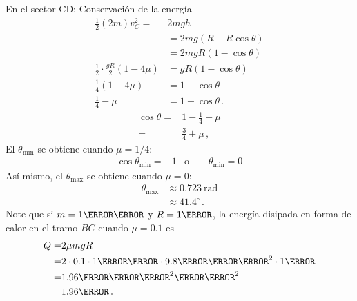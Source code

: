 \begin{itemize}
En el sector CD: Conservación de la energía
\begin{align}
  \tfrac{1}{2}(2m)v_C^2=&2mgh\nonumber\\
&=2mg(R-R\cos\theta)\nonumber\\
&=2mgR(1-\cos\theta)\nonumber\\
  \frac{1}{2}\cdot\frac{gR}{2}\left(1-4\mu \right)&=gR(1-\cos\theta)\nonumber\\
  \frac{1}{4}\left(1-4\mu \right)&=1-\cos\theta\nonumber\\
  \frac{1}{4}-\mu&=1-\cos\theta\,.
\end{align}
\begin{align}
  \cos\theta=&1-\frac{1}{4}+\mu\nonumber\\
  =&\frac{3}{4}+\mu\,,
\end{align}
El $\theta_{\text{min}}$ se obtiene cuando $\mu=1/4$:
\begin{align}
 \cos \theta_{\text{min}}=&1 &\text{o} \qquad \theta_{\text{min}}=0
\end{align}
Así mismo, el $\theta_{\text{max}}$ se obtiene cuando $\mu=0$:
\begin{align}
  \theta_{\text{max}}&\approx 0.723\ \text{rad}\nonumber\\
&\approx 41.4^\circ\,.
\end{align}
Note que si $m=1\kilo\gram$ y $R=1\meter$, la energía disipada en
forma de calor en el tramo $BC$ cuando $\mu=0.1$ es
\begin{align}
  Q=&2 \mu m g R\nonumber\\
  =&2\cdot 0.1\cdot 1\kilo\gram\cdot 9.8\meter\per\second^2\cdot
  1\meter\nonumber\\
  =&1.96\kilo\gram \meter^2\per\second^2\nonumber\\
  =&1.96\joule\,.
\end{align}

\end{itemize}

